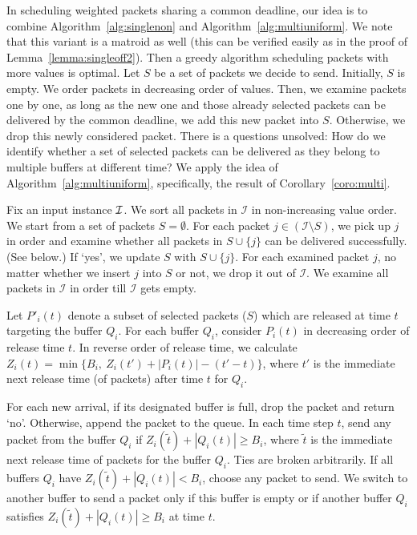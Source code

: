\documentclass[final, 11pt]{article}
\begin{document}
In scheduling weighted packets sharing a common deadline, our idea is to combine Algorithm~\ref{alg:singlenon} and Algorithm~\ref{alg:multiuniform}. We note that this variant is a matroid as well (this can be verified easily as in the proof of Lemma~\ref{lemma:singleoff2}). Then a greedy algorithm  scheduling packets with more values is optimal. Let $S$ be a set of packets we decide to send. Initially, $S$ is empty. We order packets in decreasing order of values. Then, we examine packets one by one, as long as the new one and those already selected packets can be delivered by the common deadline, we add this new packet into $S$. Otherwise, we drop this newly considered packet. There is a questions unsolved: How do we identify whether a set of selected packets can be delivered as they belong to multiple buffers at different time? We apply the idea of Algorithm~\ref{alg:multiuniform}, specifically, the result of Corollary~\ref{coro:multi}.

\begin{algorithm}
Fix an input instance $\cal I$. We sort all packets in $\mathcal I$ in non-increasing value order. We start from a set of packets $S = \emptyset$. For each packet $j \in ({\mathcal I} \setminus S)$, we pick up $j$ in order and examine whether all packets in $S \cup \{j\}$ can be delivered successfully. (See below.) If `yes', we update $S$ with $S \cup \{j\}$. For each examined packet $j$, no matter whether we insert $j$ into $S$ or not, we drop it out of $\mathcal I$. We examine all packets in $\mathcal I$ in order till $\mathcal I$ gets empty.

Let $P'_i(t)$ denote a subset of selected packets ($S$) which are released at time $t$ targeting the buffer $Q_i$. For each buffer $Q_i$, consider $P_i(t)$ in decreasing order of release time $t$. In reverse order of release time, we calculate $Z_i(t) = \min\{B_i, \ Z_i(t') + |P_i(t)| - (t' - t)\}$, where $t'$ is the immediate next release time (of packets) after time $t$ for $Q_i$.

For each new arrival, if its designated buffer is full, drop the packet and return `no'. Otherwise, append the packet to the queue. In each time step $t$, send any packet from the buffer $Q_i$ if $Z_i({\tilde t}) + |Q_i(t)| \ge B_i$, where ${\tilde t}$ is the immediate next release time of packets for the buffer $Q_i$. Ties are broken arbitrarily. If all buffers $Q_i$ have $Z_i({\tilde t}) + |Q_i(t)| < B_i$, choose any packet to send. We switch to another buffer to send a packet only if this buffer is empty or if another buffer $Q_i$ satisfies $Z_i({\tilde t}) + |Q_i(t)| \ge B_i$ at time $t$.
\label{alg:multinon}
\end{algorithm}
\end{document}
